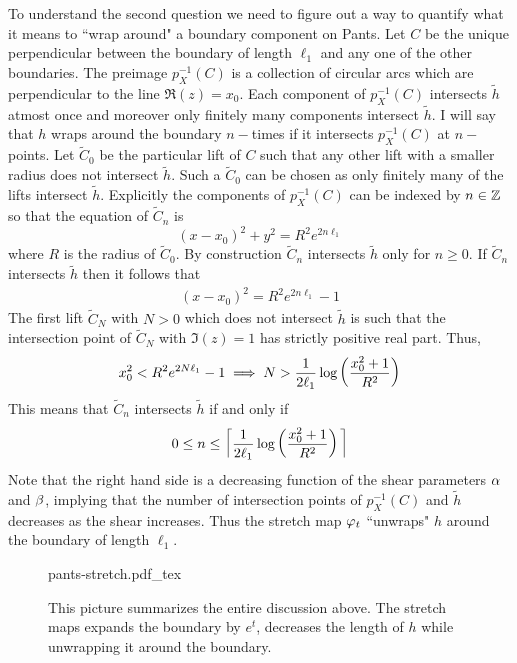 \begin{exmp}
\begin{figure}[t]
  \end{figure}
  To understand the second question we need to figure out a way to quantify what it means to ``wrap around" a boundary component on Pants. Let $C$ be the unique perpendicular between the boundary of length $\ell_1$ and any one of the other boundaries. The preimage $p_X^{-1}(C)$ is a collection of circular arcs which are perpendicular to the line $\Re(z) = x_0$. Each component of $p_X^{-1}(C)$ intersects $\tilde{h}$ atmost once and moreover only finitely many components intersect $\tilde{h}$. I will say that $h$ wraps around the boundary $n-$times if it intersects $p^{-1}_X(C)$ at $n-$points. Let $\tilde{C}_0$ be the particular lift of $C$ such that any other lift with a smaller radius does not intersect $\tilde{h}$. Such a $\tilde{C}_0$ can be chosen as only finitely many of the lifts intersect $\tilde{h}$. Explicitly the components of $p^{-1}_X(C)$ can be indexed by $n\in \mathbb{Z}$ so that the equation of $\tilde{C}_n$ is
  $$(x-x_0)^2 + y^2 = R^2e^{2n\ell_1}$$
  where $R$ is the radius of $\tilde{C}_0$. By construction $\tilde{C}_n$ intersects $\tilde{h}$ only for $n\geq 0$. If $\tilde{C}_n$ intersects $\tilde{h}$ then it follows that
  \begin{align*}
    (x-x_0)^2 = R^2e^{2n \ell_1} - 1 
  \end{align*}
  The first lift $\tilde{C}_N$ with $N>0$ which does not intersect $\tilde{h}$ is such that the intersection point of $\tilde{C}_N$ with $\Im(z)=1$ has strictly positive real part. Thus,
  \begin{align}
    x_0^2 < R^2 e^{2N \ell_1} -1 \implies N> \frac{1}{2\ell_1} \log\left(\frac{x_0^2 + 1}{R^2}\right)
  \end{align}
  This means that $\tilde{C}_n$ intersects $\tilde{h}$ if and only if 
  $$0 \leq n \leq \bigg\lceil \frac{1}{2\ell_1} \log\left(\frac{x_0^2 + 1}{R^2}\right)\bigg\rceil$$
  Note that the right hand side is a decreasing function of the shear parameters $\alpha$ and $\beta$, implying that the number of intersection points of $p^{-1}_X(C)$ and $\tilde{h}$ decreases as the shear increases. Thus the stretch map $\varphi_t$ ``unwraps" $h$ around the boundary of length $\ell_1$. 
  \begin{figure}[h]
    \centering
    \def\svgwidth{\textwidth}
    {pants-stretch.pdf_tex}
    \caption[Stretch maps on Pants]{This picture summarizes the entire discussion above. The stretch maps expands the boundary by $e^t$, decreases the length of $h$ while unwrapping it around the boundary.}
  \end{figure}
\end{exmp}
